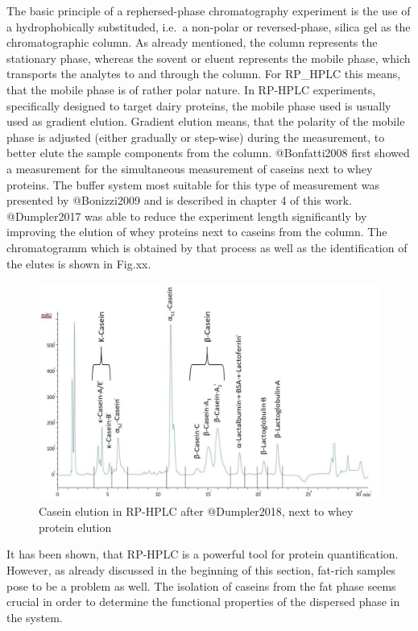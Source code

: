 \documentclass[
]{article}
\begin{document}
The basic principle of a rephersed-phase chromatography experiment is
the use of a hydrophobically substituded, i.e.~a non-polar or
reversed-phase, silica gel as the chromatographic column. As already
mentioned, the column represents the stationary phase, whereas the
sovent or eluent represents the mobile phase, which transports the
analytes to and through the column. For RP\_HPLC this means, that the
mobile phase is of rather polar nature. In RP-HPLC experiments,
specifically designed to target dairy proteins, the mobile phase used is
usually used as gradient elution. Gradient elution means, that the
polarity of the mobile phase is adjusted (either gradually or step-wise)
during the measurement, to better elute the sample components from the
column. @Bonfatti2008 first showed a measurement for the simultaneous
measurement of caseins next to whey proteins. The buffer system most
suitable for this type of measurement was presented by @Bonizzi2009 and
is described in chapter 4 of this work. @Dumpler2017 was able to reduce
the experiment length significantly by improving the elution of whey
proteins next to caseins from the column. The chromatogramm which is
obtained by that process as well as the identification of the elutes is
shown in Fig.xx.

\begin{figure}
\centering
\includegraphics{images/elution_casein.jpg}
\caption{Casein elution in RP-HPLC after @Dumpler2018, next to whey
protein elution}
\end{figure}

It has been shown, that RP-HPLC is a powerful tool for protein
quantification. However, as already discussed in the beginning of this
section, fat-rich samples pose to be a problem as well. The isolation of
caseins from the fat phase seems crucial in order to determine the
functional properties of the dispersed phase in the system.
\end{document}
